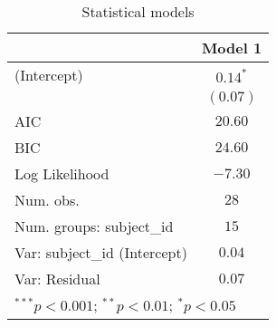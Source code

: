
\begin{table}
\begin{center}
\begin{tabular}{l c}
\hline
 & Model 1 \\
\hline
(Intercept)                  & $0.14^{*}$ \\
                             & $(0.07)$   \\
\hline
AIC                          & $20.60$    \\
BIC                          & $24.60$    \\
Log Likelihood               & $-7.30$    \\
Num. obs.                    & $28$       \\
Num. groups: subject\_id     & $15$       \\
Var: subject\_id (Intercept) & $0.04$     \\
Var: Residual                & $0.07$     \\
\hline
\multicolumn{2}{l}{\scriptsize{$^{***}p<0.001$; $^{**}p<0.01$; $^{*}p<0.05$}}
\end{tabular}
\caption{Statistical models}
\label{table:coefficients}
\end{center}
\end{table}


